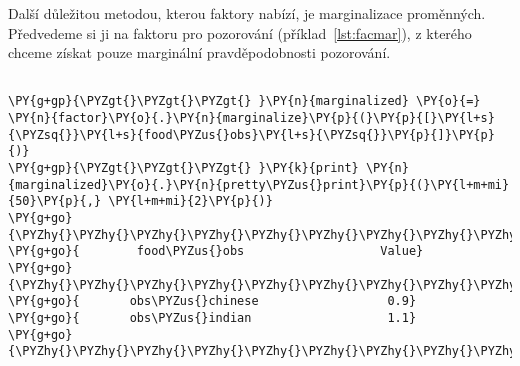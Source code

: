 Další důležitou metodou, kterou faktory nabízí, je marginalizace proměnných.
Předvedeme si ji na faktoru pro pozorování (příklad~\ref{lst:facmar}), z kterého chceme získat pouze marginální pravděpodobnosti pozorování.

\begin{example}
\begin{Verbatim}[commandchars=\\\{\}]

\PY{g+gp}{\PYZgt{}\PYZgt{}\PYZgt{} }\PY{n}{marginalized} \PY{o}{=} \PY{n}{factor}\PY{o}{.}\PY{n}{marginalize}\PY{p}{(}\PY{p}{[}\PY{l+s}{\PYZsq{}}\PY{l+s}{food\PYZus{}obs}\PY{l+s}{\PYZsq{}}\PY{p}{]}\PY{p}{)}
\PY{g+gp}{\PYZgt{}\PYZgt{}\PYZgt{} }\PY{k}{print} \PY{n}{marginalized}\PY{o}{.}\PY{n}{pretty\PYZus{}print}\PY{p}{(}\PY{l+m+mi}{50}\PY{p}{,} \PY{l+m+mi}{2}\PY{p}{)}
\PY{g+go}{\PYZhy{}\PYZhy{}\PYZhy{}\PYZhy{}\PYZhy{}\PYZhy{}\PYZhy{}\PYZhy{}\PYZhy{}\PYZhy{}\PYZhy{}\PYZhy{}\PYZhy{}\PYZhy{}\PYZhy{}\PYZhy{}\PYZhy{}\PYZhy{}\PYZhy{}\PYZhy{}\PYZhy{}\PYZhy{}\PYZhy{}\PYZhy{}\PYZhy{}\PYZhy{}\PYZhy{}\PYZhy{}\PYZhy{}\PYZhy{}\PYZhy{}\PYZhy{}\PYZhy{}\PYZhy{}\PYZhy{}\PYZhy{}\PYZhy{}\PYZhy{}\PYZhy{}\PYZhy{}\PYZhy{}\PYZhy{}\PYZhy{}\PYZhy{}\PYZhy{}\PYZhy{}\PYZhy{}\PYZhy{}\PYZhy{}\PYZhy{}}
\PY{g+go}{        food\PYZus{}obs                   Value}
\PY{g+go}{\PYZhy{}\PYZhy{}\PYZhy{}\PYZhy{}\PYZhy{}\PYZhy{}\PYZhy{}\PYZhy{}\PYZhy{}\PYZhy{}\PYZhy{}\PYZhy{}\PYZhy{}\PYZhy{}\PYZhy{}\PYZhy{}\PYZhy{}\PYZhy{}\PYZhy{}\PYZhy{}\PYZhy{}\PYZhy{}\PYZhy{}\PYZhy{}\PYZhy{}\PYZhy{}\PYZhy{}\PYZhy{}\PYZhy{}\PYZhy{}\PYZhy{}\PYZhy{}\PYZhy{}\PYZhy{}\PYZhy{}\PYZhy{}\PYZhy{}\PYZhy{}\PYZhy{}\PYZhy{}\PYZhy{}\PYZhy{}\PYZhy{}\PYZhy{}\PYZhy{}\PYZhy{}\PYZhy{}\PYZhy{}\PYZhy{}\PYZhy{}}
\PY{g+go}{       obs\PYZus{}chinese                  0.9}
\PY{g+go}{       obs\PYZus{}indian                   1.1}
\PY{g+go}{\PYZhy{}\PYZhy{}\PYZhy{}\PYZhy{}\PYZhy{}\PYZhy{}\PYZhy{}\PYZhy{}\PYZhy{}\PYZhy{}\PYZhy{}\PYZhy{}\PYZhy{}\PYZhy{}\PYZhy{}\PYZhy{}\PYZhy{}\PYZhy{}\PYZhy{}\PYZhy{}\PYZhy{}\PYZhy{}\PYZhy{}\PYZhy{}\PYZhy{}\PYZhy{}\PYZhy{}\PYZhy{}\PYZhy{}\PYZhy{}\PYZhy{}\PYZhy{}\PYZhy{}\PYZhy{}\PYZhy{}\PYZhy{}\PYZhy{}\PYZhy{}\PYZhy{}\PYZhy{}\PYZhy{}\PYZhy{}\PYZhy{}\PYZhy{}\PYZhy{}\PYZhy{}\PYZhy{}\PYZhy{}\PYZhy{}\PYZhy{}}
\end{Verbatim}
\caption{Marginalizace faktoru}
\label{lst:facmar}
\end{example}


